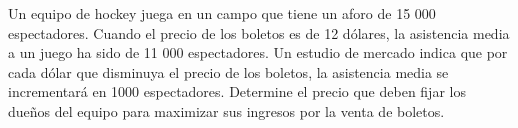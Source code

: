 \item Un equipo de hockey juega en un campo que tiene un aforo de 15 000 espectadores. Cuando el precio de los boletos es de 12 dólares, la asistencia media a un juego ha sido de 11 000 espectadores. Un estudio de mercado indica que por cada dólar que disminuya el precio de los boletos, la asistencia media se incrementará en 1000 espectadores. Determine el precio que deben fijar los dueños del equipo para maximizar sus ingresos por la venta de boletos.
